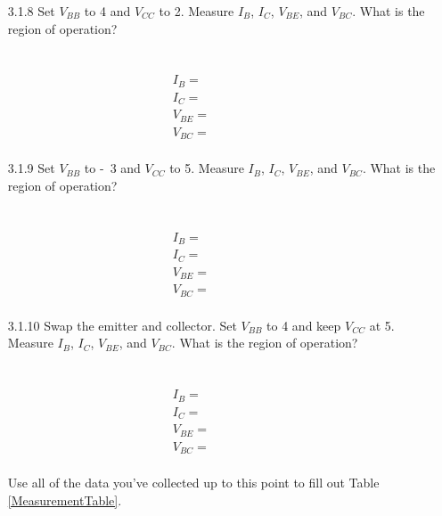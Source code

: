 \documentclass{article}
\begin{document}
\begin{enumerate}
\item[3.1.8] Set $V_{BB}$ to \unit{4}{\volt} and $V_{CC}$ to \unit{2}{\volt}. Measure $I_B$, $I_C$, $V_{BE}$, and $V_{BC}$. What is the region of operation?
  \\~\\~\\
  \begin{align*}
    \boxed{I_B    = ~~~~~~~~~~~~~~~~~~~~~~ } \\
    \boxed{I_C    = ~~~~~~~~~~~~~~~~~~~~~~ } \\
    \boxed{V_{BE} = ~~~~~~~~~~~~~~~~~~~~~~ } \\
    \boxed{V_{BC} = ~~~~~~~~~~~~~~~~~~~~~~ } \\
  \end{align*}

\item[3.1.9] Set $V_{BB}$ to \unit{-3}{\volt} and $V_{CC}$ to \unit{5}{\volt}. Measure $I_B$, $I_C$, $V_{BE}$, and $V_{BC}$. What is the region of operation?
  \\~\\~\\
  \begin{align*}
    \boxed{I_B    = ~~~~~~~~~~~~~~~~~~~~~~ } \\
    \boxed{I_C    = ~~~~~~~~~~~~~~~~~~~~~~ } \\
    \boxed{V_{BE} = ~~~~~~~~~~~~~~~~~~~~~~ } \\
    \boxed{V_{BC} = ~~~~~~~~~~~~~~~~~~~~~~ } \\
  \end{align*}

\item[3.1.10] Swap the emitter and collector. Set $V_{BB}$ to \unit{4}{\volt} and keep $V_{CC}$ at \unit{5}{\volt}. Measure $I_B$, $I_C$, $V_{BE}$, and $V_{BC}$. What is the region of operation?
  \\~\\~\\
  \begin{align*}
    \boxed{I_B    = ~~~~~~~~~~~~~~~~~~~~~~ } \\
    \boxed{I_C    = ~~~~~~~~~~~~~~~~~~~~~~ } \\
    \boxed{V_{BE} = ~~~~~~~~~~~~~~~~~~~~~~ } \\
    \boxed{V_{BC} = ~~~~~~~~~~~~~~~~~~~~~~ } \\
  \end{align*}

Use all of the data you've collected up to this point to fill out Table \ref{MeasurementTable}.
  

\end{enumerate}
\end{document}
